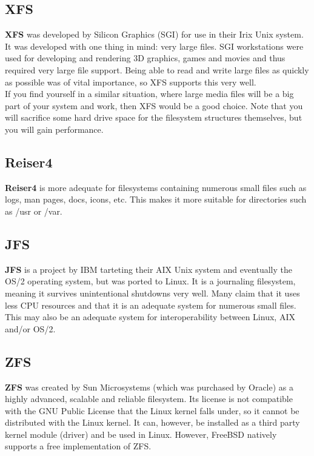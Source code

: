 \subsection{XFS}

\textbf{XFS} was developed by Silicon Graphics (SGI) for use in their Irix Unix system.  It was developed with one thing in mind: very large files.  SGI workstations were used for developing and rendering 3D graphics, games and movies and thus required very large file support.  Being able to read and write large files as quickly as possible was of vital importance, so XFS supports this very well.\\

If you find yourself in a similar situation, where large media files will be a big part of your system and work, then XFS would be a good choice.  Note that you will sacrifice some hard drive space for the filesystem structures themselves, but you will gain performance.

\subsection{Reiser4}

\textbf{Reiser4} is more adequate for filesystems containing numerous small files such as logs, man pages, docs, icons, etc.  This makes it more suitable for directories such as /usr or /var.

\subsection{JFS}

\textbf{JFS} is a project by IBM tarteting their AIX Unix system and eventually the OS/2 operating system, but was ported to Linux.  It is a journaling filesystem, meaning it survives unintentional shutdowns very well.  Many claim that it uses less CPU resources and that it is an adequate system for numerous small files.  This may also be an adequate system for interoperability between Linux, AIX and/or OS/2.

\subsection{ZFS}

\textbf{ZFS} was created by Sun Microsystems (which was purchased by Oracle) as a highly advanced, scalable and reliable filesystem.  Its license is not compatible with the GNU Public License that the Linux kernel falls under, so it cannot be distributed with the Linux kernel.  It can, however, be installed as a third party kernel module (driver) and be used in Linux.  However, FreeBSD natively supports a free implementation of ZFS.\\

